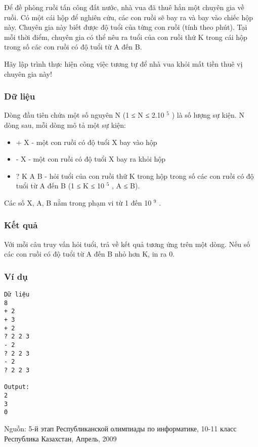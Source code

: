 



   Để đề phòng ruồi tấn công đất nước, nhà vua đã thuê hẳn một chuyên gia về ruồi. Có một cái hộp để nghiên cứu, các con ruồi sẽ bay ra và bay vào chiếc hộp này. Chuyên gia này biết được độ tuổi của từng con ruồi (tính theo phút). Tại mỗi thời điểm, chuyên gia có thể nêu ra tuổi của con ruồi thứ K trong cái hộp trong số các con ruồi có độ tuổi từ A đến B.  

   Hãy lập trình thực hiện công việc tương tự để nhà vua khỏi mất tiền thuê vị chuyên gia này!  

\subsubsection{   Dữ liệu  }

   Dòng đầu tiên chứa một số nguyên N (1 ≤ N ≤ 2.10   $^    5   $   ) là số lượng sự kiện. N dòng sau, mỗi dòng mô tả một sự kiện:  
\begin{itemize}
	\item     + X - một con ruồi có độ tuổi X bay vào hộp   
	\item     - X - một con ruồi có độ tuổi X bay ra khỏi hộp   
	\item     ? K A B - hỏi tuổi của con ruồi thứ K trong hộp trong số các con ruồi có độ tuổi từ A đến B (1 ≤ K ≤ 10    $^     5    $    , A ≤ B).   
\end{itemize}

   Các số X, A, B nằm trong phạm vi từ 1 đến 10   $^    9   $   .  

\subsubsection{   Kết quả  }

   Với mỗi câu truy vấn hỏi tuổi, trả về kết quả tương ứng trên một dòng. Nếu số các con ruồi có độ tuổi từ A đến B nhỏ hơn K, in ra 0.  

\subsubsection{   Ví dụ  }
\begin{verbatim}
Dữ liệu
8			
+ 2		
+ 3		
+ 2		
? 2 2 3
- 2		
? 2 2 3
- 2		
? 2 2 3

Output:
2
3
0
\end{verbatim}

   Nguồn: 5-й этап Республиканской олимпиады по информатике, 10-11 класс Республика Казахстан, Апрель, 2009  